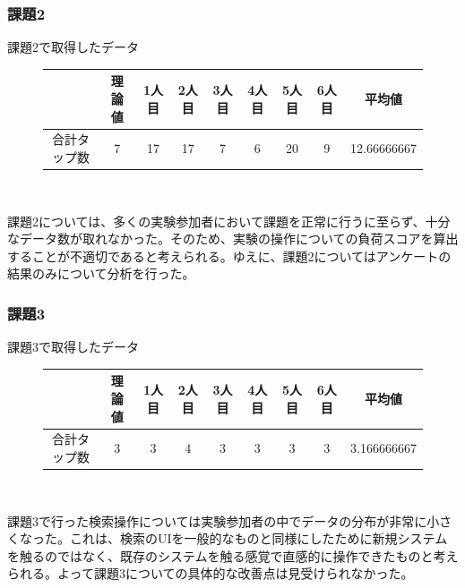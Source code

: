 \documentclass[12pt,a4paper,dvipdf]{jsarticle}
\begin{document}
\subsubsection{課題2}
課題2で取得したデータ\\
\begin{figure}[H]
    \centering
    \begin{tabular}{c|c|c|c|c|c|c|c|c}
               & 理論値 & 1人目 & 2人目 & 3人目 & 4人目 & 5人目 & 6人目 & 平均値         \\
        \hline
        合計タップ数 & 7   & 17  & 17  & 7   & 6   & 20  & 9   & 12.66666667
    \end{tabular}\\
\end{figure}
課題2については、多くの実験参加者において課題を正常に行うに至らず、十分なデータ数が取れなかった。そのため、実験の操作についての負荷スコアを算出することが不適切であると考えられる。ゆえに、課題2についてはアンケートの結果のみについて分析を行った。
\subsubsection{課題3}
課題3で取得したデータ\\
\begin{figure}[H]
    \centering
    \begin{tabular}{c|c|c|c|c|c|c|c|c}
               & 理論値 & 1人目 & 2人目 & 3人目 & 4人目 & 5人目 & 6人目 & 平均値         \\
        \hline
        合計タップ数 & 3   & 3   & 4   & 3   & 3   & 3   & 3   & 3.166666667
    \end{tabular}\\
\end{figure}
課題3で行った検索操作については実験参加者の中でデータの分布が非常に小さくなった。これは、検索のUIを一般的なものと同様にしたために新規システムを触るのではなく、既存のシステムを触る感覚で直感的に操作できたものと考えられる。よって課題3についての具体的な改善点は見受けられなかった。
\end{document}
